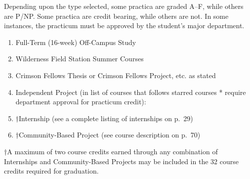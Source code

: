 \documentclass[
  letterpaper,
]{scrbook}
\providecommand{\tightlist}{%
  \setlength{\itemsep}{0pt}\setlength{\parskip}{0pt}}
\begin{document}
Depending upon the type selected, some practica are graded A--F, while
others are P/NP. Some practica are credit bearing, while others are not.
In some instances, the practicum must be approved by the student's major
department.

\begin{enumerate}
\def\labelenumi{\arabic{enumi}.}
\tightlist
\item
  Full-Term (16-week) Off-Campus Study
\item
  Wilderness Field Station Summer Courses
\item
  Crimson Fellows Thesis or Crimson Fellows Project, etc. as stated
\item
  Independent Project (in list of courses that follows starred courses *
  require department approval for practicum credit):
\item
  †Internship (see a complete listing of internships on p.~29)
\item
  †Community-Based Project (see course description on p.~70)
\end{enumerate}

†A maximum of two course credits earned through any combination of
Internships and Community-Based Projects may be included in the 32
course credits required for graduation.
\end{document}
